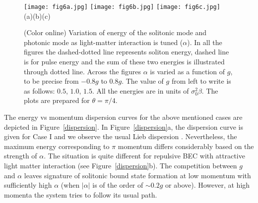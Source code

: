 \documentclass[epj]{svjour}
\begin{document}
\begin{figure*}[t]
\begin{center}
\texttt{[image: fig6a.jpg]}
\texttt{[image: fig6b.jpg]}
\texttt{[image: fig6c.jpg]}\\
\hfill (a)\hfill\hfill (b)\hfill\hfill (c)\hfill\hfill
\caption{(Color online) Variation of energy of the solitonic mode and photonic mode as light-matter interaction is tuned ($\alpha$). In all the figures the dashed-dotted line represents soliton energy, dashed line is for pulse energy and the sum of these two energies is illustrated through dotted line. Across the figures $\alpha$ is varied as a function of $g$, to be precise from $-0.8g$ to $0.8g$. The value of $g$ from left to write is as follows: $0.5$, $1.0$, $1.5$. All the energies are in units of $\sigma_0^2\beta$. The plots are prepared for $\theta=\pi/4$.}
\label{eatom}
\end{center}
\end{figure*}

The energy vs momentum dispersion curves for the above mentioned cases are depicted in Figure~\ref{dispersion}. In Figure~\ref{dispersion}a, the dispersion curve is given for Case I and we observe the usual Lieb dispersion \cite{lieb,jackson}. Nevertheless, the maximum energy corresponding to $\pi$ momentum differs considerably based on the strength of $\alpha$. The situation is quite different for repulsive BEC with attractive light matter interaction (see Figure~\ref{dispersion}b). The competition between $g$ and $\alpha$ leaves signature of solitonic bound state formation at low momentum with sufficiently high $\alpha$ (when $|\alpha|$ is of the order of $\sim0.2g$ or above). However, at high momenta the system tries to follow its usual path.
\end{document}
